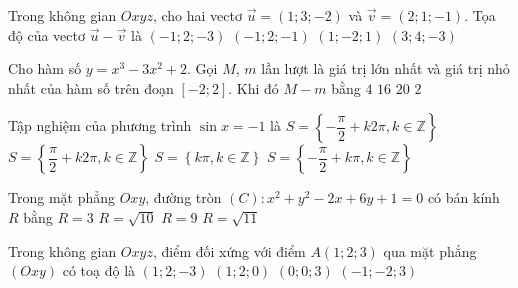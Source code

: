\begin{ex}%
	Trong không gian $Oxyz$, cho hai vectơ $\overrightarrow{u}=(1;3;-2)$ và $\overrightarrow{v}=(2;1;-1)$. Tọa độ của vectơ $\overrightarrow{u}-\overrightarrow{v}$ là
	\choice
	{ $(-1;2;-3)$}
	{\True $(-1;2;-1)$}
	{ $(1;-2;1)$}
	{ $(3;4;-3)$}
\end{ex}

\begin{ex}%
	Cho hàm số $y=x^3-3x^2+2$. Gọi $M$, $m$ lần lượt là giá trị lớn nhất và giá trị nhỏ nhất của hàm số trên đoạn $[-2;2]$. Khi đó $M-m$ bằng
	\choice
	{$4$}
	{$16$}
	{\True $20$}
	{$2$}
\end{ex}

\begin{ex}%
	Tập nghiệm của phương trình $\sin x=-1$ là
	\choice
	{\True $S=\left\{-\dfrac{\pi}{2}+k2\pi ,k\in \mathbb{Z}\right\}$}
	{ $S=\left\{\dfrac{\pi}{2}+k2\pi ,k\in \mathbb{Z}\right\}$}
	{ $S=\left\{k\pi ,k\in \mathbb{Z}\right\}$}
	{ $S=\left\{-\dfrac{\pi}{2}+k\pi ,k\in \mathbb{Z}\right\}$ }
\end{ex}

\begin{ex}%
	Trong mặt phẳng $Oxy$, đường tròn $(C)\colon x^2+y^2-2x+6y+1=0$ có bán kính $R$ bằng
	\choice
	{\True $R=3$}
	{ $R=\sqrt{10}$}
	{ $R=9$}
	{ $R=\sqrt{11}$}
\end{ex}

\begin{ex}%
	Trong không gian $Oxyz$, điểm đối xứng với điểm $A(1;2;3)$ qua mặt phẳng $(Oxy)$ có toạ độ là
	\choice
	{\True $(1;2;-3)$}
	{ $(1;2;0)$}
	{ $(0;0;3)$}
	{ $(-1;-2;3)$}
\end{ex}


